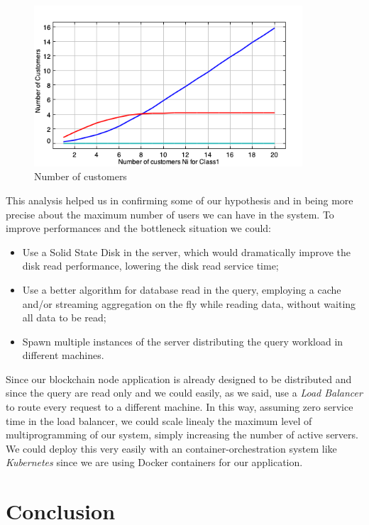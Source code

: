 \documentclass[11pt]{scrartcl} %
\begin{document}
\begin{figure}[h]
\includegraphics[width=10cm]{Images/JMVAnumUsers.png}
\centering
\caption{Number of customers}
\label{fig:img5}
\end{figure}

This analysis helped us in confirming some of our hypothesis and in being more precise about the maximum number of users we can have in the system. To improve performances and the bottleneck situation we could:

\begin{itemize}
\item[\adforn{43}] Use a Solid State Disk in the server, which would dramatically improve the disk read performance, lowering the disk read service time;
\item[\adforn{43}] Use a better algorithm for database read in the query, employing a cache and/or streaming aggregation on the fly while reading data, without waiting all data to be read;
\item[\adforn{43}] Spawn multiple instances of the server distributing the query workload in different machines.
\end{itemize}

Since our blockchain node application is already designed to be distributed and since the query are read only and we could easily, as we said, use a \textit{Load Balancer} to route every request to a different machine. In this way, assuming zero service time in the load balancer, we could scale linealy the maximum level of multiprogramming of our system, simply increasing the number of active servers. We could deploy this very easily with an container-orchestration system like \textit{Kubernetes} since we are using Docker containers for our application.

\section{Conclusion}
\end{document}
